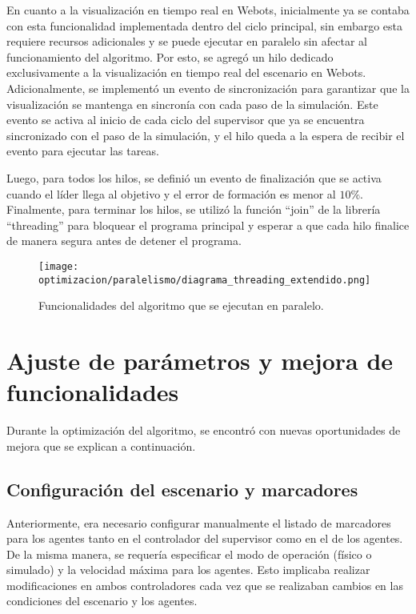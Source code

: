 En cuanto a la visualización en tiempo real en Webots, inicialmente ya se contaba con esta funcionalidad implementada dentro del ciclo principal, sin embargo esta requiere recursos adicionales y se puede ejecutar en paralelo sin afectar al funcionamiento del algoritmo. Por esto, se agregó un hilo dedicado exclusivamente a la visualización en tiempo real del escenario en Webots. Adicionalmente, se implementó un evento de sincronización para garantizar que la visualización se mantenga en sincronía con cada paso de la simulación. Este evento se activa al inicio de cada ciclo del supervisor que ya se encuentra sincronizado con el paso de la simulación, y el hilo queda a la espera de recibir el evento para ejecutar las tareas.

Luego, para todos los hilos, se definió un evento de finalización que se activa cuando el líder llega al objetivo y el error de formación es menor al $10\%$. Finalmente, para terminar los hilos, se utilizó la función ``join'' de la librería ``threading'' para bloquear el programa principal y esperar a que cada hilo finalice de manera segura antes de detener el programa.


\begin{figure}[H]
	\centering
	\texttt{[image: optimizacion/paralelismo/diagrama\_threading\_extendido.png]}
	\caption{Funcionalidades del algoritmo que se ejecutan en paralelo.}
	\label{fig:diagrama_hilos}
\end{figure}

\section{Ajuste de parámetros y mejora de funcionalidades}
Durante la optimización del algoritmo, se encontró con nuevas oportunidades de mejora que se explican a continuación.

\subsection{Configuración del escenario y marcadores}
Anteriormente, era necesario configurar manualmente el listado de marcadores para los agentes tanto en el controlador del supervisor como en el de los agentes. De la misma manera, se requería especificar el modo de operación (físico o simulado) y la velocidad máxima para los agentes. Esto implicaba realizar modificaciones en ambos controladores cada vez que se realizaban cambios en las condiciones del escenario y los agentes.

